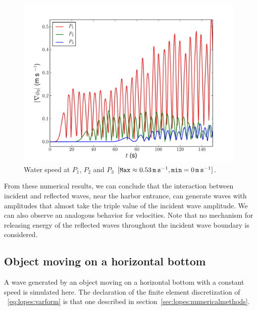 \begin{figure}
\begin{center}
\includegraphics[width=\largefig]{chapters/lopes/pdf/velprofile.pdf}
\end{center}
\caption{Water speed at $P_1$, $P_2$ and $P_3$ $[{\tt
      Max}\approx 0.53\, {\tt m\, s}^{-1}, {\tt min}=0\,{\tt
      m\, s}^{-1}]$.}
\label{fig:lopes:velp}
\end{figure}

From these numerical results, we can conclude that the
interaction between incident and reflected waves, near the
harbor entrance, can generate waves with amplitudes that almost
take the triple value of the incident wave amplitude.  We
can also observe an analogous behavior for velocities.  Note
that no mechanism for releasing energy of the reflected
waves throughout the incident wave boundary is considered.


\subsection{Object moving on a horizontal bottom}
A wave generated by an object moving on a horizontal bottom
with a constant speed is simulated here.  The declaration of
the finite element discretization of
~\eqref{eq:lopes:varform} is that one described in
section~\ref{sec:lopes:numericalmethods}.

